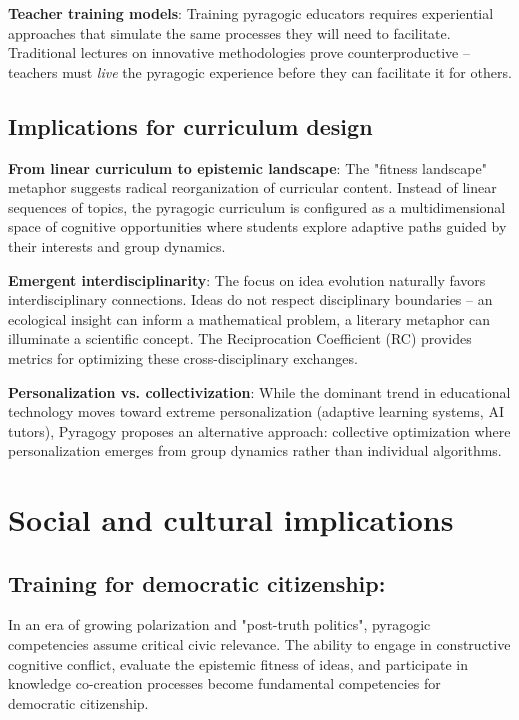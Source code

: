 \textbf{Teacher training models}:
Training pyragogic educators requires experiential approaches that simulate the same processes they will need to facilitate. Traditional lectures on innovative methodologies prove counterproductive -- teachers must \textit{live} the pyragogic experience before they can facilitate it for others.

\subsection{Implications for curriculum design}

\textbf{From linear curriculum to epistemic landscape}:
The "fitness landscape" metaphor suggests radical reorganization of curricular content. Instead of linear sequences of topics, the pyragogic curriculum is configured as a multidimensional space of cognitive opportunities where students explore adaptive paths guided by their interests and group dynamics.

\textbf{Emergent interdisciplinarity}:
The focus on idea evolution naturally favors interdisciplinary connections. Ideas do not respect disciplinary boundaries -- an ecological insight can inform a mathematical problem, a literary metaphor can illuminate a scientific concept. The Reciprocation Coefficient (RC) provides metrics for optimizing these cross-disciplinary exchanges.

\textbf{Personalization vs. collectivization}:
While the dominant trend in educational technology moves toward extreme personalization (adaptive learning systems, AI tutors), Pyragogy proposes an alternative approach: collective optimization where personalization emerges from group dynamics rather than individual algorithms.

\section{Social and cultural implications}
\subsection*{Training for democratic citizenship:}

In an era of growing polarization and "post-truth politics", pyragogic competencies assume critical civic relevance. The ability to engage in constructive cognitive conflict, evaluate the epistemic fitness of ideas, and participate in knowledge co-creation processes become fundamental competencies for democratic citizenship.


